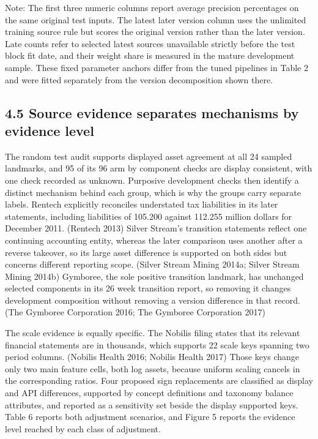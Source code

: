 \documentclass[10pt,a4paper,twocolumn]{article}
\begin{document}
Note: The first three numeric columns report average precision percentages on the same original test inputs. The latest later version column uses the unlimited training source rule but scores the original version rather than the later version. Late counts refer to selected latest sources unavailable strictly before the test block fit date, and their weight share is measured in the mature development sample. These fixed parameter anchors differ from the tuned pipelines in Table 2 and were fitted separately from the version decomposition shown there.

\subsection{4.5 Source evidence separates mechanisms by evidence level}

The random test audit supports displayed asset agreement at all 24 sampled landmarks, and 95 of its 96 arm by component checks are display consistent, with one check recorded as unknown. Purposive development checks then identify a distinct mechanism behind each group, which is why the groups carry separate labels. Rentech explicitly reconciles understated tax liabilities in its later statements, including liabilities of 105.200 against 112.255 million dollars for December 2011. (Rentech 2013) Silver Stream's transition statements reflect one continuing accounting entity, whereas the later comparison uses another after a reverse takeover, so its large asset difference is supported on both sides but concerns different reporting scope. (Silver Stream Mining 2014a; Silver Stream Mining 2014b) Gymboree, the sole positive transition landmark, has unchanged selected components in its 26 week transition report, so removing it changes development composition without removing a version difference in that record. (The Gymboree Corporation 2016; The Gymboree Corporation 2017)

The scale evidence is equally specific. The Nobilis filing states that its relevant financial statements are in thousands, which supports 22 scale keys spanning two period columns. (Nobilis Health 2016; Nobilis Health 2017) Those keys change only two main feature cells, both log assets, because uniform scaling cancels in the corresponding ratios. Four proposed sign replacements are classified as display and API differences, supported by concept definitions and taxonomy balance attributes, and reported as a sensitivity set beside the display supported keys. Table 6 reports both adjustment scenarios, and Figure 5 reports the evidence level reached by each class of adjustment.
\end{document}
